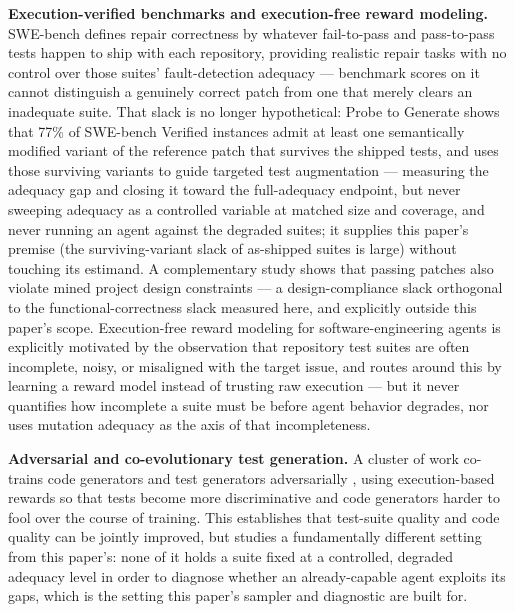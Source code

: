 \documentclass[11pt]{article}
\begin{document}
\textbf{Execution-verified benchmarks and execution-free reward modeling.} SWE-bench \citep{SWEbench_VTF8yNQM66} defines repair correctness by whatever fail-to-pass and pass-to-pass tests happen to ship with each repository, providing realistic repair tasks with no control over those suites' fault-detection adequacy --- benchmark scores on it cannot distinguish a genuinely correct patch from one that merely clears an inadequate suite. That slack is no longer hypothetical: Probe to Generate \citep{ProbeToGenerate_2604_01518} shows that 77\% of SWE-bench Verified instances admit at least one semantically modified variant of the reference patch that survives the shipped tests, and uses those surviving variants to guide targeted test augmentation --- measuring the adequacy gap and closing it toward the full-adequacy endpoint, but never sweeping adequacy as a controlled variable at matched size and coverage, and never running an agent against the degraded suites; it supplies this paper's premise (the surviving-variant slack of as-shipped suites is large) without touching its estimand. A complementary study \citep{DesignCompliance_2604_05955} shows that passing patches also violate mined project design constraints --- a design-compliance slack orthogonal to the functional-correctness slack measured here, and explicitly outside this paper's scope. Execution-free reward modeling for software-engineering agents \citep{2512_21919} is explicitly motivated by the observation that repository test suites are often incomplete, noisy, or misaligned with the target issue, and routes around this by learning a reward model instead of trusting raw execution --- but it never quantifies how incomplete a suite must be before agent behavior degrades, nor uses mutation adequacy as the axis of that incompleteness.

\textbf{Adversarial and co-evolutionary test generation.} A cluster of work co-trains code generators and test generators adversarially \citep{CURE_wPdBe9zxNr,ATGen_Sxj4o3qXtl,UTRL_VqjNYF9nbP}, using execution-based rewards so that tests become more discriminative and code generators harder to fool over the course of training. This establishes that test-suite quality and code quality can be jointly improved, but studies a fundamentally different setting from this paper's: none of it holds a suite fixed at a controlled, degraded adequacy level in order to diagnose whether an already-capable agent exploits its gaps, which is the setting this paper's sampler and diagnostic are built for.
\end{document}
